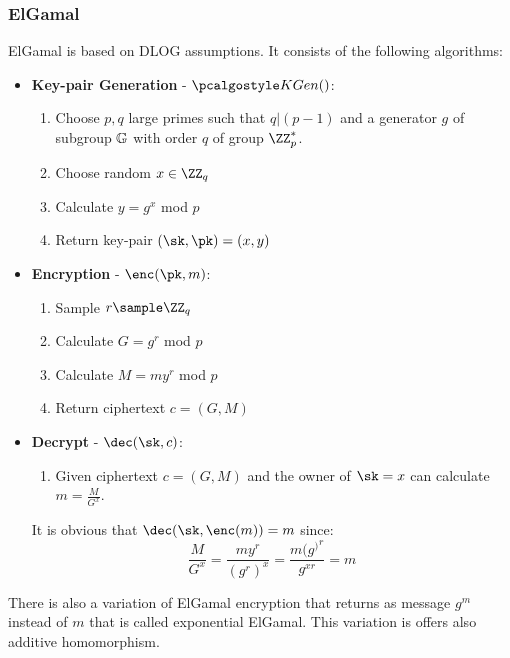 \subsubsection{ElGamal}
ElGamal is based on DLOG assumptions. It consists of the following algorithms:
\begin{itemize}
    \item \textbf{Key-pair Generation} - $\kgen()$:
    \begin{enumerate}
        \item Choose $p,q$ large primes such that $q|(p-1)$ and a generator $g$ of subgroup $\mathbb{G}$ with order $q$ of group $\ZZ_p^*$.
        \item Choose random $x \in \ZZ_q$
        \item Calculate $y = g^x$ mod $p$
        \item Return key-pair $(\sk, \pk) = (x,y)$ 
    \end{enumerate}

    \item \textbf{Encryption} - $\enc(\pk, m)$:
    \begin{enumerate}
        \item Sample $r \sample \ZZ_q$
        \item Calculate $G = g^r$ mod $p$
        \item Calculate $M = my^r$ mod $p$
        \item Return ciphertext $c = (G,M)$
    \end{enumerate}

    \item \textbf{Decrypt} - $\dec(\sk, c)$:
    \begin{enumerate}
        \item Given ciphertext $c = (G,M)$ and the owner of $\sk = x$ can calculate $m = \frac{M}{G^x}$.
    \end{enumerate}
    It is obvious that $\dec(\sk, \enc(m)) = m$ since:
    \begin{equation*}
        \frac{M}{G^x} = \frac{my^r}{{(g^r)}^x} = \frac{{m(g^)}^r}{g^{xr}} = m
    \end{equation*}
\end{itemize}

There is also a variation of ElGamal encryption that returns as message $g^m$ instead of $m$ that is called exponential ElGamal. This variation is offers also additive homomorphism.

% 